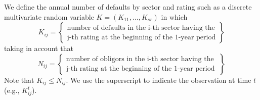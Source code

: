 \documentclass[11pt,fleqn]{book} %
\begin{document}
\begin{definition}
	We define the annual number of defaults by sector and rating such as a
	discrete multivariate random variable $K=(K_{11}, \dots, K_{sr})$ in which
	\begin{displaymath}
		K_{ij} = \left\{
		\begin{array}{c}
			\text{number of defaults in the i-th sector having the} \\
			\text{j-th rating at the beginning of the 1-year period}
		\end{array}
		\right\}
	\end{displaymath}
	taking in account that
	\begin{displaymath}
		N_{ij} = \left\{
		\begin{array}{c}
			\text{number of obligors in the i-th sector having the } \\
			\text{j-th rating at the beginning of the 1-year period}
		\end{array}
		\right\}
	\end{displaymath}
	Note that $K_{ij} \le N_{ij}$. We use the superscript to indicate 
	the observation at time $t$ (e.g., $K_{ij}^t$).
\end{definition}
\end{document}
